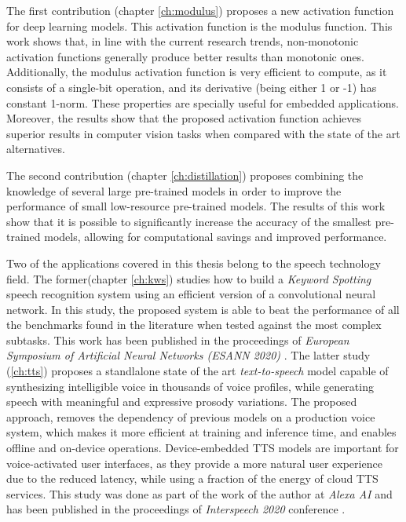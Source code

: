 The first contribution (chapter \ref{ch:modulus}) proposes a new activation function for deep learning models. This activation function is the modulus function. This work shows that, in line with the current research trends, non-monotonic activation functions generally produce better results than monotonic ones. Additionally, the modulus activation function is very efficient to compute, as it consists of a single-bit operation, and its derivative (being either 1 or -1) has constant 1-norm. These properties are specially useful for embedded applications. Moreover, the results show that the proposed activation function achieves superior results in computer vision tasks when compared with the state of the art alternatives.

The second contribution (chapter \ref{ch:distillation}) proposes combining the knowledge of several large pre-trained models in order to improve the performance of small low-resource pre-trained models. The results of this work show that it is possible to significantly increase the accuracy of the smallest pre-trained models, allowing for computational savings and improved performance.

Two of the applications covered in this thesis belong to the speech technology field. The former(chapter \ref{ch:kws}) studies how to build a \textit{Keyword Spotting} speech recognition system using an efficient version of a convolutional neural network. In this study, the proposed system is able to beat the performance of all the benchmarks found in the literature when tested against the most complex subtasks. This work has been published in the proceedings of \textit{European Symposium of Artificial Neural Networks (ESANN 2020)} \autocite{valles2021a}. The latter study (\ref{ch:tts}) proposes a standlalone state of the art \textit{text-to-speech} model capable of synthesizing intelligible voice in thousands of voice profiles, while generating speech with meaningful and expressive prosody variations. The proposed approach, removes the dependency of previous models on a production voice system, which makes it more efficient at training and inference time, and enables offline and on-device operations. Device-embedded TTS models are important for voice-activated user interfaces, as they provide a more natural user experience due to the reduced latency, while using a fraction of the energy of cloud TTS services. This study was done as part of the work of the author at \textit{Alexa AI} and has been published in the proceedings of \textit{Interspeech 2020} conference \autocite{valles2021b}.

